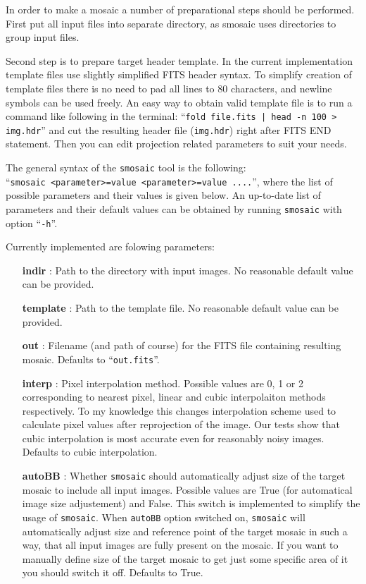 \documentclass[12pt]{article}
\begin{document}
In order to make a mosaic a number of preparational steps should be 
performed. First put all input files into separate directory, as smosaic 
uses directories to group input files.

Second step is to prepare target header template. In the current 
implementation template files use slightly simplified FITS header 
syntax. To simplify creation of template files there is no need to 
pad all lines to 80 characters, and newline symbols can be used freely. 
An easy way to obtain valid template file is to run a command like 
following in the terminal: 
``\verb/fold file.fits | head -n 100 > img.hdr/''
and cut the resulting header file (\verb/img.hdr/) right after 
FITS END statement. Then you can edit projection related parameters 
to suit your needs.

The general syntax of the \verb/smosaic/ tool is the following: \\
``\verb/smosaic <parameter>=value <parameter>=value ..../'', where the list of 
possible parameters and their values is given below. An up-to-date list of parameters
and their default values can be obtained by running \verb/smosaic/ with option
 ``\verb/-h/''.

Currently implemented are folowing parameters:
\begin{itemize}
\item[\bf indir] : Path to the directory with input images. 
No reasonable default value can be provided.

\item[\bf template] : Path to the template file. 
No reasonable default value can be provided.

\item[\bf out] : Filename (and path of course) for the FITS file containing 
resulting mosaic. Defaults to ``\verb/out.fits/''.

\item[\bf interp] : Pixel interpolation method. Possible values are 0, 1 or 
2 corresponding to nearest pixel, linear and cubic interpolaiton methods 
respectively. To my knowledge this changes interpolation scheme used to 
calculate pixel values after reprojection of the image. Our tests show that 
cubic interpolation is most accurate even for reasonably noisy images. 
Defaults to cubic interpolation.

\item[\bf autoBB] : Whether \verb/smosaic/ should automatically adjust size
of the target mosaic to include all input images. Possible values are 
True (for automatical image size adjustement) and False. This switch is 
implemented to simplify the usage of \verb/smosaic/. When \verb/autoBB/ 
option switched on, \verb/smosaic/ will automatically adjust size and 
reference point of the target mosaic in such a way, that all input images
are fully present on the mosaic. If you want to manually define size of the
target mosaic to get just some specific area of it you should switch it off.
Defaults to True.
\end{itemize}
\end{document}
